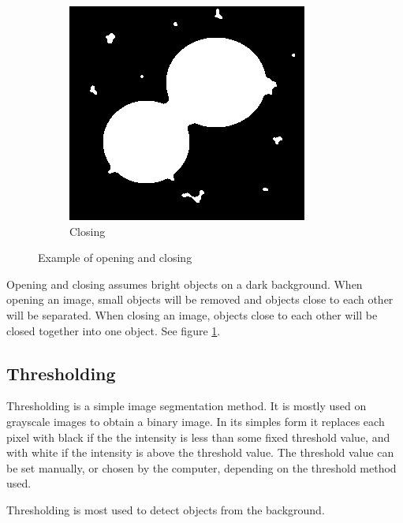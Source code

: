 \begin{figure}[h]
    \begin{subfigure}{.33\textwidth}
        \centering
        \includegraphics[width=.9\linewidth]{images/literature/closing}
        \caption{Closing}
    \end{subfigure}
    \caption{Example of opening and closing}
    \label{fig:dots_opening_closing}
\end{figure}

Opening and closing assumes bright objects on a dark background. When opening an image, small objects will be removed and objects close to each other will be separated. When closing an image, objects close to each other will be closed together into one object. See figure \ref{fig:dots_opening_closing}.




\newpage
\subsection{Thresholding}

Thresholding is a simple image segmentation method. It is mostly used on grayscale images to obtain a binary image. In its simples form it replaces each pixel with black if the the intensity is less than some fixed threshold value, and with white if the intensity is above the threshold value. 
The threshold value can be set manually, or chosen by the computer, depending on the threshold method used. 

Thresholding is most used to detect objects from the background.

